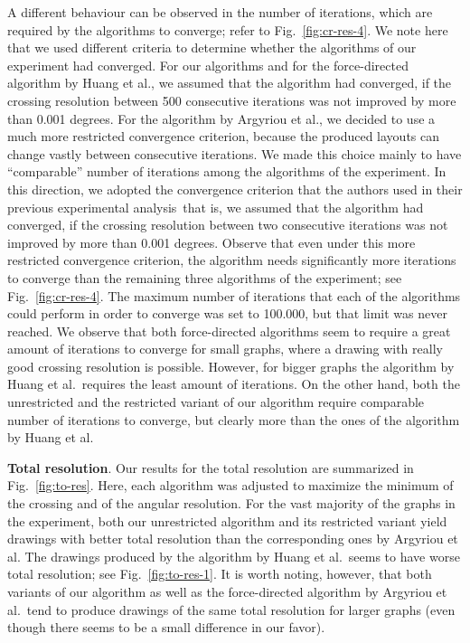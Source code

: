 \documentclass[runningheads]{llncs}
\newcommand{\myparagraph}[1]{\smallskip\noindent\textbf{#1}.}
\begin{document}
A different behaviour can be observed in the number of iterations, which are required by the algorithms to converge; refer to Fig.~\ref{fig:cr-res-4}. We note here that we used different criteria to determine whether the algorithms of our experiment had converged. For our algorithms and for the force-directed algorithm by Huang et al., we assumed that the algorithm had converged, if the crossing resolution between 500 consecutive iterations was not improved by more than 0.001 degrees. For the algorithm by Argyriou et al., we decided to use a much more restricted convergence criterion, because the produced layouts can change vastly between  consecutive iterations. We made this choice mainly to have ``comparable'' number of iterations among the algorithms of the experiment. In this direction, we adopted the convergence criterion that the authors used in their previous experimental analysis\, that is, we assumed that the algorithm had converged, if the crossing resolution between two consecutive iterations was not improved by more than 0.001 degrees. Observe that even under this more restricted convergence criterion, the algorithm needs significantly more iterations to converge than the remaining three algorithms of the experiment; see Fig.~\ref{fig:cr-res-4}. The maximum number of iterations that each of the algorithms could perform in order to converge was set to 100.000, but that limit was never reached. We observe that both force-directed algorithms seem to require a great amount of iterations to converge for small graphs, where a drawing with really good crossing resolution is possible. However, for bigger graphs  the algorithm by Huang et al.\ requires the least amount of iterations. On the other hand, both the unrestricted and the restricted variant of our algorithm require comparable number of iterations to converge, but clearly more than the ones of the algorithm by Huang et al. 

\myparagraph{Total resolution} Our results for the total resolution are summarized in Fig.~\ref{fig:to-res}. Here, each algorithm was adjusted to maximize the minimum of the crossing and of the angular resolution. For the vast majority of the graphs in the experiment, both our unrestricted algorithm and its restricted variant yield  drawings with better total resolution than the corresponding ones by Argyriou et al. The drawings produced by the algorithm by Huang et al.\ seems to have worse total resolution; see Fig.~\ref{fig:to-res-1}. It is worth noting, however, that both variants of our algorithm as well as the force-directed algorithm by Argyriou et al.\ tend to produce drawings of the same total resolution for larger graphs (even though there seems to be a small difference in our favor). 
\end{document}
